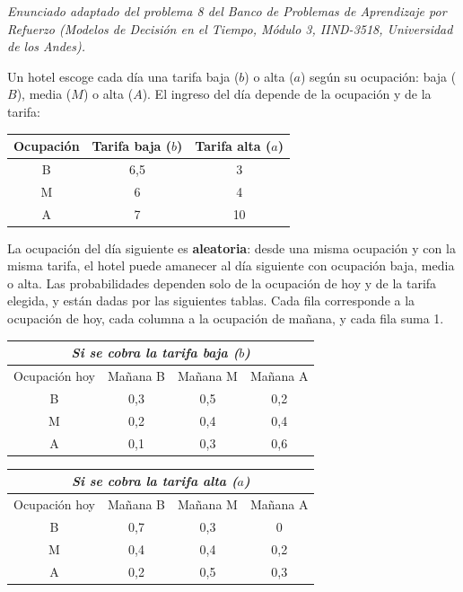 \noindent\textit{Enunciado adaptado del problema 8 del Banco de Problemas de Aprendizaje por Refuerzo (Modelos de Decisión en el Tiempo, Módulo 3, IIND-3518, Universidad de los Andes).}

\bigskip

\noindent Un hotel escoge cada día una tarifa baja ($b$) o alta ($a$) según su ocupación: baja ($B$), media ($M$) o alta ($A$). El ingreso del día depende de la ocupación y de la tarifa:

\begin{table}[H]
\centering
\begin{tabular}{ccc}
\toprule
Ocupación & Tarifa baja ($b$) & Tarifa alta ($a$)\\
\midrule
B & 6,5 & 3\\
M & 6 & 4\\
A & 7 & 10\\
\bottomrule
\end{tabular}
\end{table}

\noindent La ocupación del día siguiente es \textbf{aleatoria}: desde una misma ocupación y con la misma tarifa, el hotel puede amanecer al día siguiente con ocupación baja, media o alta. Las probabilidades dependen solo de la ocupación de hoy y de la tarifa elegida, y están dadas por las siguientes tablas. Cada fila corresponde a la ocupación de hoy, cada columna a la ocupación de mañana, y cada fila suma 1.

\begin{table}[H]
\centering
\begin{tabular}{cccc}
\multicolumn{4}{c}{\textit{Si se cobra la tarifa baja ($b$)}}\\
\toprule
Ocupación hoy & Mañana B & Mañana M & Mañana A\\
\midrule
B & 0,3 & 0,5 & 0,2\\
M & 0,2 & 0,4 & 0,4\\
A & 0,1 & 0,3 & 0,6\\
\bottomrule
\end{tabular}
\qquad
\begin{tabular}{cccc}
\multicolumn{4}{c}{\textit{Si se cobra la tarifa alta ($a$)}}\\
\toprule
Ocupación hoy & Mañana B & Mañana M & Mañana A\\
\midrule
B & 0,7 & 0,3 & 0\\
M & 0,4 & 0,4 & 0,2\\
A & 0,2 & 0,5 & 0,3\\
\bottomrule
\end{tabular}
\end{table}


